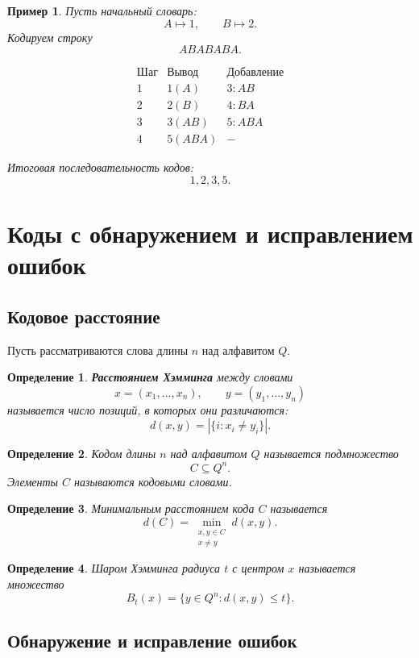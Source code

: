 \documentclass[12pt,a4paper]{article}
\newtheorem{definition}{Определение}[section]
\newtheorem{example}{Пример}[section]
\begin{document}
\begin{example}
Пусть начальный словарь:
\[
    A\mapsto 1,\qquad B\mapsto 2.
\]
Кодируем строку
\[
    ABABABA.
\]

\[
\begin{array}{c|c|c}
\text{Шаг} & \text{Вывод} & \text{Добавление}\\
\hline
1 & 1(A) & 3:AB\\
2 & 2(B) & 4:BA\\
3 & 3(AB) & 5:ABA\\
4 & 5(ABA) & -
\end{array}
\]

Итоговая последовательность кодов:
\[
    1,2,3,5.
\]
\end{example}

\section{Коды с обнаружением и исправлением ошибок}

\subsection{Кодовое расстояние}

Пусть рассматриваются слова длины $n$ над алфавитом $Q$.

\begin{definition}
\textbf{Расстоянием Хэмминга} между словами
\[
    x=(x_1,\dots,x_n),\qquad y=(y_1,\dots,y_n)
\]
называется число позиций, в которых они различаются:
\[
    d(x,y)=|\{i:x_i\ne y_i\}|.
\]
\end{definition}

\begin{definition}
Кодом длины $n$ над алфавитом $Q$ называется подмножество
\[
    C\subseteq Q^n.
\]
Элементы $C$ называются кодовыми словами.
\end{definition}

\begin{definition}
Минимальным расстоянием кода $C$ называется
\[
    d(C)=\min_{\substack{x,y\in C\\x\ne y}}d(x,y).
\]
\end{definition}

\begin{definition}
Шаром Хэмминга радиуса $t$ с центром $x$ называется множество
\[
    B_t(x)=\{y\in Q^n:d(x,y)\le t\}.
\]
\end{definition}

\subsection{Обнаружение и исправление ошибок}
\end{document}
